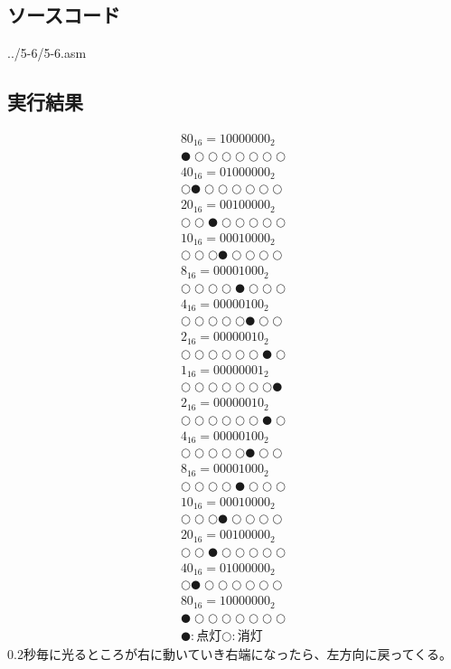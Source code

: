 \documentclass[a4paper,12pt]{ujarticle}
\begin{document}
  \subsection{ソースコード}
  \begin{lstinputlisting}[basicstyle=\ttfamily\footnotesize, frame=single]
   {../5-6/5-6.asm}
  \end{lstinputlisting}
  \subsection{実行結果}
  \begin{eqnarray*}
   {80}_{16} = 10000000_2 \\
   ●○○○○○○○ \\
   {40}_{16} = 01000000_2 \\
   ○●○○○○○○ \\
   {20}_{16} = 00100000_2 \\
   ○○●○○○○○ \\
   {10}_{16} = 00010000_2 \\
   ○○○●○○○○ \\
   {8}_{16}  = 00001000_2 \\
   ○○○○●○○○ \\
   {4}_{16}  = 00000100_2 \\
   ○○○○○●○○ \\
   {2}_{16}  = 00000010_2 \\
   ○○○○○○●○ \\
   {1}_{16}  = 00000001_2 \\
   ○○○○○○○● \\
   {2}_{16}  = 00000010_2 \\
   ○○○○○○●○ \\
   {4}_{16}  = 00000100_2 \\
   ○○○○○●○○ \\
   {8}_{16}  = 00001000_2 \\
   ○○○○●○○○ \\
   {10}_{16} = 00010000_2 \\
   ○○○●○○○○ \\
   {20}_{16} = 00100000_2 \\
   ○○●○○○○○ \\
   {40}_{16} = 01000000_2 \\
   ○●○○○○○○ \\
   {80}_{16} = 10000000_2 \\
   ●○○○○○○○ \\
   ●:点灯○:消灯
  \end{eqnarray*}
  0.2秒毎に光るところが右に動いていき右端になったら、左方向に戻ってくる。
\end{document}
